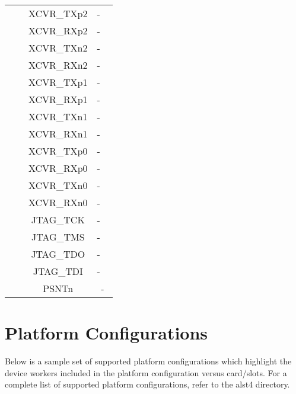 \documentclass{article}
\begin{document}
\begin{longtable}[l]{|c|c|c|c|}
  & & XCVR\_TXp2 & - \
  \\\cline{3-4}
  & & XCVR\_RXp2 & - \
  \\\cline{3-4}
  & & XCVR\_TXn2 & - \
  \\\cline{3-4}
  & & XCVR\_RXn2 & - \
  \\\cline{3-4}
  & & XCVR\_TXp1 & - \
  \\\cline{3-4}
  & & XCVR\_RXp1 & - \
  \\\cline{3-4}
  & & XCVR\_TXn1 & - \
  \\\cline{3-4}
  & & XCVR\_RXn1 & - \
  \\\cline{3-4}
  & & XCVR\_TXp0 & - \
  \\\cline{3-4}
  & & XCVR\_RXp0 & - \
  \\\cline{3-4}
  & & XCVR\_TXn0 & - \
  \\\cline{3-4}
  & & XCVR\_RXn0 & - \
  \\\cline{3-4}
  & & JTAG\_TCK & - \
  \\\cline{3-4}
  & & JTAG\_TMS & - \
  \\\cline{3-4}
  & & JTAG\_TDO & - \
  \\\cline{3-4}
  & & JTAG\_TDI & - \
  \\\cline{3-4}
  & & PSNTn & - \\
	\hline
\end{longtable}
\newpage

\section*{Platform Configurations}
Below is a sample set of supported platform configurations which  highlight the device workers included in the platform configuration versus card/slots. For a complete list of supported platform configurations, refer to the alst4 directory. \\
\end{document}

